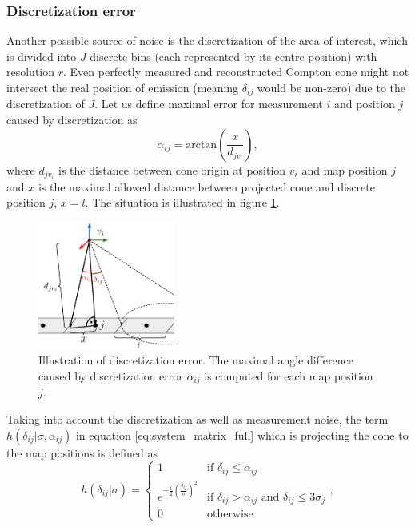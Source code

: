\subsubsection{Discretization error}
Another possible source of noise is the discretization of the area of interest, which is divided into $J$ discrete bins (each represented by its centre position) with resolution $r$.
Even perfectly measured and reconstructed Compton cone might not intersect the real position of emission (meaning $\delta_{ij}$ would be non-zero) due to the discretization of $J$.
Let us define maximal error for measurement $i$ and position $j$ caused by discretization as
\begin{equation}
  \alpha_{ij} = \mathrm{arctan}(\frac{x}{d_{jv_{i}}}),
  \label{eq:alpha}
\end{equation}
where $d_{jv_{i}}$ is the distance between cone origin at position $v_{i}$ and map position $j$ and $x$ is the maximal allowed distance between projected cone and discrete position $j$, $x = l$.
The situation is illustrated in figure \ref{fig:discret}.
\begin{figure}
  \centering
\includegraphics[width=0.4\textwidth]{./fig/photos/discret.eps}
  \caption{ 
Illustration of discretization error. The maximal angle difference caused by discretization error $\alpha_{ij}$ is computed for each map position $j$.}
  \label{fig:discret}
\end{figure}
Taking into account the discretization as well as measurement noise, the term $h(\delta_{ij}|\sigma, \alpha_{ij})$ in equation \ref{eq:system_matrix_full} which is projecting the cone to the map positions is defined as
\begin{equation}
h(\delta_{ij}|\sigma) =
\begin{cases}
1 & \text{if $\delta_{ij}\leq \alpha_{ij}$}\\ 
e^{- \frac{1}{2}(\frac{\delta_{ij}}{\sigma})^{2}} & \text{if $\delta_{ij} > \alpha_{ij}$ and  $\delta_{ij} \leq 3\sigma_{j}$} \\
0 & \text{otherwise}
\end{cases}, 
\end{equation}
